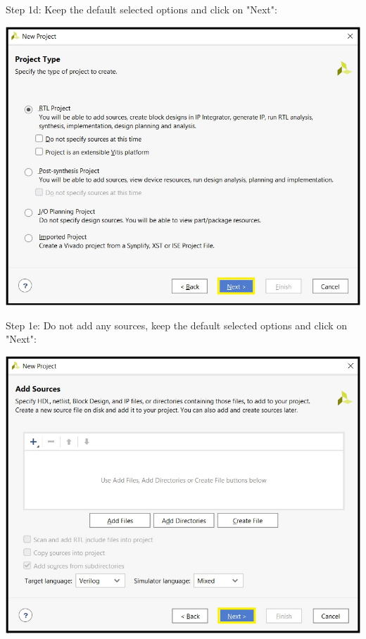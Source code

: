 \begin{minipage}{\linewidth}
  Step 1d: Keep the default selected options and click on "Next": \\
  \begin{center}
    \includegraphics[width=0.8\linewidth]{images/vivado01d.png}
  \end{center}
\end{minipage}

\begin{minipage}{\linewidth}
  Step 1e: Do not add any sources, keep the default selected options and click on "Next": \\
  \begin{center}
    \includegraphics[width=0.7\linewidth]{images/vivado01e.png}
  \end{center}
\end{minipage}

\vspace{5mm}

